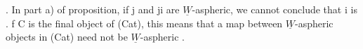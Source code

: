 \hand{\uline{\textcolor{black}{Remark 4}}} .  In part a) of proposition,  if j and ji are $\underline{W}$-aspheric,  we
cannot conclude that i is .  f C is the final object of (Cat),  this
means that a map between $\underline{W}$-aspheric objects in (Cat) need not be
$\underline{W}$-aspheric .

